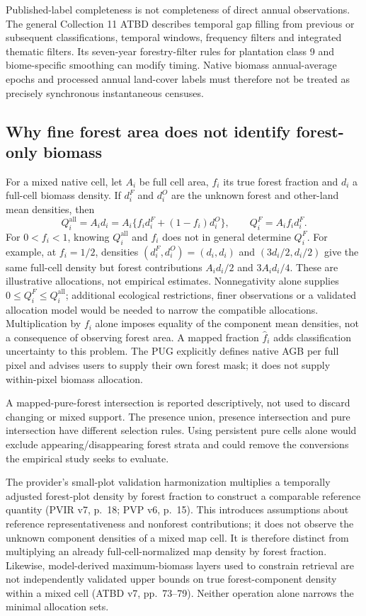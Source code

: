 \documentclass[11pt,a4paper]{article}
\begin{document}
Published-label completeness is not completeness of direct annual observations. The general Collection 11 ATBD describes temporal gap filling from previous or subsequent classifications, temporal windows, frequency filters and integrated thematic filters. Its seven-year forestry-filter rules for plantation class 9 and biome-specific smoothing can modify timing. Native biomass annual-average epochs and processed annual land-cover labels must therefore not be treated as precisely synchronous instantaneous censuses.

\subsection{Why fine forest area does not identify forest-only biomass}
For a mixed native cell, let $A_i$ be full cell area, $f_i$ its true forest fraction and $d_i$ a full-cell biomass density. If $d_i^F$ and $d_i^O$ are the unknown forest and other-land mean densities, then
\begin{equation}
Q_i^{\mathrm{all}}=A_i d_i=A_i\{f_i d_i^F+(1-f_i)d_i^O\},\qquad Q_i^F=A_i f_i d_i^F.
\end{equation}
For $0<f_i<1$, knowing $Q_i^{\mathrm{all}}$ and $f_i$ does not in general determine $Q_i^F$. For example, at $f_i=1/2$, densities $(d_i^F,d_i^O)=(d_i,d_i)$ and $(3d_i/2,d_i/2)$ give the same full-cell density but forest contributions $A_i d_i/2$ and $3A_i d_i/4$. These are illustrative allocations, not empirical estimates. Nonnegativity alone supplies $0\le Q_i^F\le Q_i^{\mathrm{all}}$; additional ecological restrictions, finer observations or a validated allocation model would be needed to narrow the compatible allocations. Multiplication by $f_i$ alone imposes equality of the component mean densities, not a consequence of observing forest area. A mapped fraction $\widehat f_i$ adds classification uncertainty to this problem. The PUG explicitly defines native AGB per full pixel and advises users to supply their own forest mask; it does not supply within-pixel biomass allocation.

A mapped-pure-forest intersection is reported descriptively, not used to discard changing or mixed support. The presence union, presence intersection and pure intersection have different selection rules. Using persistent pure cells alone would exclude appearing/disappearing forest strata and could remove the conversions the empirical study seeks to evaluate.

The provider's small-plot validation harmonization multiplies a temporally adjusted forest-plot density by forest fraction to construct a comparable reference quantity (PVIR v7, p.~18; PVP v6, p.~15). This introduces assumptions about reference representativeness and nonforest contributions; it does not observe the unknown component densities of a mixed map cell. It is therefore distinct from multiplying an already full-cell-normalized map density by forest fraction. Likewise, model-derived maximum-biomass layers used to constrain retrieval are not independently validated upper bounds on true forest-component density within a mixed cell (ATBD v7, pp.~73--79). Neither operation alone narrows the minimal allocation sets.
\end{document}
